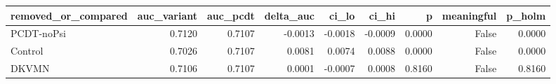\begin{tabular}{lrrrrrrrr}
\toprule
removed\_or\_compared & auc\_variant & auc\_pcdt & delta\_auc & ci\_lo & ci\_hi & p & meaningful & p\_holm \\
\midrule
PCDT-noPsi & 0.7120 & 0.7107 & -0.0013 & -0.0018 & -0.0009 & 0.0000 & False & 0.0000 \\
Control & 0.7026 & 0.7107 & 0.0081 & 0.0074 & 0.0088 & 0.0000 & False & 0.0000 \\
DKVMN & 0.7106 & 0.7107 & 0.0001 & -0.0007 & 0.0008 & 0.8160 & False & 0.8160 \\
\bottomrule
\end{tabular}
